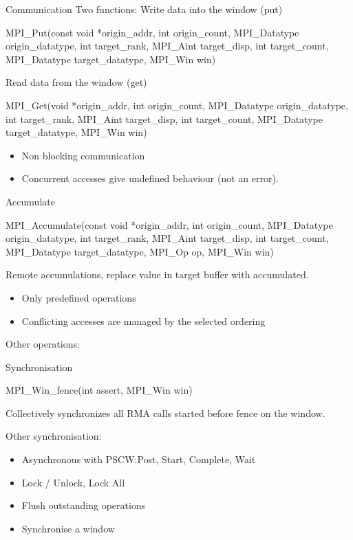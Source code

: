\documentclass[aspectratio=43]{beamer}
\begin{document}
\begin{frame}[fragile]{Communication}
Two functions:
Write data into the window (put)
\begin{Cpplisting}[]{}
MPI_Put(const void *origin_addr, int origin_count, MPI_Datatype origin_datatype, int target_rank, MPI_Aint target_disp, int target_count, MPI_Datatype target_datatype, MPI_Win win)
\end{Cpplisting}

Read data from the window (get)
\begin{Cpplisting}[]{}
MPI_Get(void *origin_addr, int origin_count, MPI_Datatype origin_datatype, int target_rank, MPI_Aint target_disp, int target_count, MPI_Datatype target_datatype, MPI_Win win)
\end{Cpplisting}

\begin{itemize}
\item Non blocking communication
\item Concurrent accesses give undefined behaviour (not an error).
\end{itemize}

\end{frame}


\begin{frame}[fragile]{Accumulate}
\begin{Cpplisting}[]{}
MPI_Accumulate(const void *origin_addr, int origin_count, MPI_Datatype origin_datatype, int target_rank, MPI_Aint target_disp, int target_count, MPI_Datatype target_datatype, MPI_Op op, MPI_Win win)
\end{Cpplisting}

Remote accumulations, replace value in target buffer with accumulated.

\begin{itemize}
\item Only predefined operations
\item Conflicting accesses are managed by the selected ordering
\end{itemize}

Other operations: 
\end{frame}

\begin{frame}[fragile]{Synchronisation}
\begin{Cpplisting}[]{}
MPI_Win_fence(int assert, MPI_Win win)
\end{Cpplisting}
Collectively synchronizes all RMA calls started before fence on the window.

Other synchronisation:
\begin{itemize}
\item Asynchronous with PSCW:\@ Post, Start, Complete, Wait
\item Lock / Unlock, Lock All
\item Flush outstanding operations
\item Synchronise a window
\end{itemize}
\end{frame}

\end{document}
